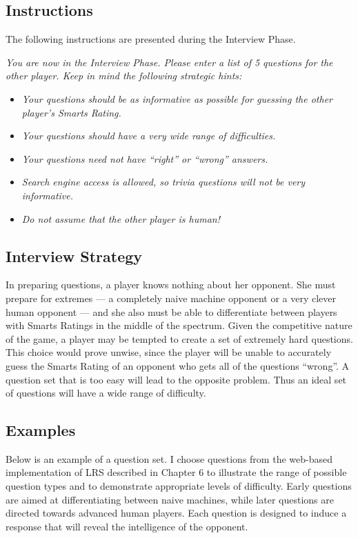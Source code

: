 \subsection{Instructions}

The following instructions are presented during the Interview Phase.
\begin{center}
\textit{You are now in the Interview Phase. Please enter a list of 5 questions for the other player. Keep in mind the following strategic hints:}

\begin{itemize}
\item \textit{Your questions should be as informative as possible for guessing the other player's Smarts Rating.}
\item \textit{Your questions should have a very wide range of difficulties.}
\item \textit{Your questions need not have ``right'' or ``wrong'' answers.}
\item \textit{Search engine access is allowed, so trivia questions will not be very informative.}
\item \textit{Do not assume that the other player is human!}
\end{itemize}
\end{center}

\subsection{Interview Strategy}

In preparing questions, a player knows nothing about her opponent. She must prepare for extremes --- a completely naive machine opponent or a very clever human opponent  --- and she also must be able to differentiate between players with Smarts Ratings in the middle of the spectrum. Given the competitive nature of the game, a player may be tempted to create a set of extremely hard questions. This choice would prove unwise, since the player will be unable to accurately guess the Smarts Rating of an opponent who gets all of the questions ``wrong''. A question set that is too easy will lead to the opposite problem. Thus an ideal set of questions will have a wide range of difficulty.

\subsection{Examples}

Below is an example of a question set. I choose questions from the web-based implementation of LRS described in Chapter 6 to illustrate the range of possible question types and to demonstrate appropriate levels of difficulty. Early questions are aimed at differentiating between naive machines, while later questions are directed towards advanced human players. Each question is designed to induce a response that will reveal the intelligence of the opponent.

